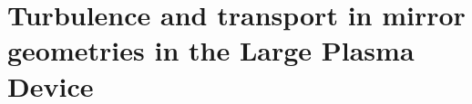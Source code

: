 \graphicspath{{Chapters/Chapter_mirror-turb/}}

\chapter{Turbulence and transport in mirror geometries in the Large Plasma Device}
\label{ch:mirror_turbulence}

%


%





